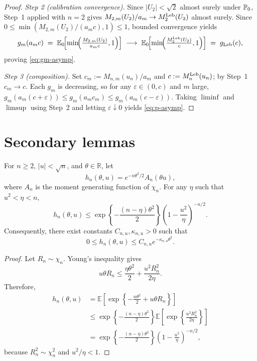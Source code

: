 \begin{proof}
\emph{Step 2 (calibration convergence).}
Since \(|U_2|<\sqrt 2\) almost surely under \(\mathbb{P}_0\), Step~1 applied with \(n=2\) gives
\(M_{2,m}(U_2)/a_m\to M_2^{\mathrm{Leb}}(U_2)\) almost surely. Since \(0\leq\min(M_{2,m}(U_2)/(a_m c),1)\leq 1\), bounded convergence yields
\[
  g_m(a_m c)
  \;=\;\mathbb{E}_0\!\Bigl[\min\!\Bigl(\tfrac{M_{2,m}(U_2)}{a_mc},1\Bigr)\Bigr]
  \;\longrightarrow\;
  \mathbb{E}_0\!\Bigl[\min\!\Bigl(\tfrac{M_2^{\mathrm{Leb}}(U_2)}{c},1\Bigr)\Bigr]
  \;=\;g_{\mathrm{Leb}}(c),
\]
proving \eqref{eq:gm-asymp}.

\emph{Step 3 (composition).}
Set \(c_m:=M_{n,m}(u_n)/a_m\) and \(c:=M_n^{\mathrm{Leb}}(u_n)\); by Step~1 \(c_m\to c\). Each \(g_m\) is decreasing, so for any \(\varepsilon\in(0,c)\) and \(m\) large, \(g_m(a_m(c+\varepsilon))\leq g_m(a_m c_m)\leq g_m(a_m(c-\varepsilon))\). Taking \(\liminf\) and \(\limsup\) using Step~2 and letting \(\varepsilon\downarrow 0\) yields \eqref{eq:p-asymp}.
\end{proof}




\section{Secondary lemmas}
\label{sec:secondarylemmas}

\begin{lemma}\label{lemma:hthetabound}
For \(n\geq2\), \(|u|<\sqrt n\), and \(\theta\in\mathbb R\), let
\begin{equation}
\label{eq:hthetadef2}
  h_n(\theta,u)
  =
  e^{-n\theta^2/2}A_n(\theta u),
\end{equation}
where \(A_n\) is the moment generating function of \(\chi_n\). For any
\(\eta\) such that \(u^2<\eta<n\),
\begin{equation}
\label{eq:hu-env}
  h_n(\theta,u)
  \leq
  \exp\left\{-\frac{(n-\eta)\theta^2}{2}\right\}
  \left(1-\frac{u^2}{\eta}\right)^{-n/2}.
\end{equation}
Consequently, there exist constants \(C_{n,u},\kappa_{n,u}>0\) such
that
\[
  0\leq h_n(\theta,u)
  \leq C_{n,u}e^{-\kappa_{n,u}\theta^2}.
\]
\end{lemma}

\begin{proof}
Let \(R_n\sim\chi_n\). Young's inequality gives
\[
  u\theta R_n
  \leq
  \frac{\eta\theta^2}{2}
  +
  \frac{u^2R_n^2}{2\eta}.
\]
Therefore,
\begin{align*}
  h_n(\theta,u)
  &=
  \mathbb E\left[
    \exp\left\{-\frac{n\theta^2}{2}+u\theta R_n\right\}
  \right]
  \\
  &\leq
  \exp\left\{-\frac{(n-\eta)\theta^2}{2}\right\}
  \mathbb E\left[
    \exp\left\{\frac{u^2R_n^2}{2\eta}\right\}
  \right]
  \\
  &=
  \exp\left\{-\frac{(n-\eta)\theta^2}{2}\right\}
  \left(1-\frac{u^2}{\eta}\right)^{-n/2},
\end{align*}
because \(R_n^2\sim\chi_n^2\) and \(u^2/\eta<1\).
\end{proof}


